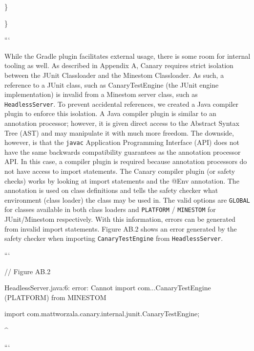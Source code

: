 \documentclass{article}
\def\code#1{\texttt{#1}}
\begin{document}
\begin{onehalfspacing}
\}

\}

```

While the Gradle plugin facilitates external usage, there is some room
for internal tooling as well. As described in Appendix A, Canary
requires strict isolation between the JUnit Classloader and the Minestom
Classloader. As such, a reference to a JUnit class, such as
CanaryTestEngine (the JUnit engine implementation) is invalid from a
Minestom server class, such as \code{HeadlessServer}. To prevent accidental
references, we created a Java compiler plugin to enforce this isolation.
A Java compiler plugin is similar to an annotation processor; however,
it is given direct access to the Abstract Syntax Tree (AST) and may
manipulate it with much more freedom. The downside, however, is that the
\code{javac} Application Programming Interface (API) does not have the same
backwards compatibility guarantees as the annotation processor API. In
this case, a compiler plugin is required because annotation processors
do not have access to import statements. The Canary compiler plugin (or
safety checks) works by looking at import statements and the @Env
annotation. The annotation is used on class definitions and tells the
safety checker what environment (class loader) the class may be used in.
The valid options are \code{GLOBAL} for classes available in both class loaders
and \code{PLATFORM} / \code{MINESTOM} for JUnit/Minestom respectively. With this
information, errors can be generated from invalid import statements.
Figure AB.2 shows an error generated by the safety checker when
importing \code{CanaryTestEngine} from \code{HeadlessServer}.

```

// Figure AB.2

HeadlessServer.java:6: error: Cannot import com...CanaryTestEngine
(PLATFORM) from MINESTOM

import com.mattworzala.canary.internal.junit.CanaryTestEngine;

\^{}

```

\end{onehalfspacing} %

\end{document}
